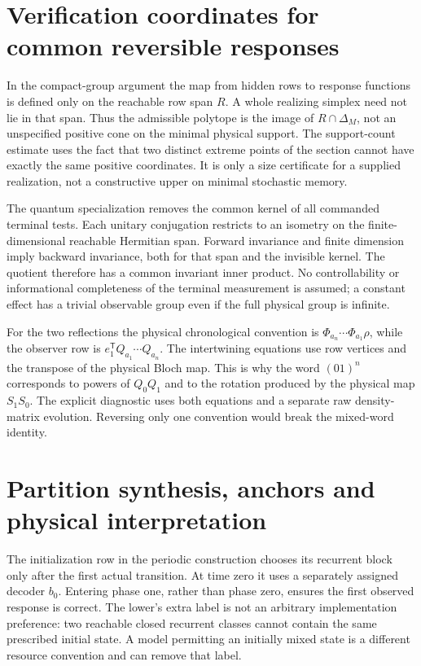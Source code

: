 \section{Verification coordinates for common reversible responses}\label{sec:supp-r72}
In the compact-group argument the map from hidden rows to response functions is defined only on the reachable row span $R$. A whole realizing simplex need not lie in that span. Thus the admissible polytope is the image of $R\cap\Delta_M$, not an unspecified positive cone on the minimal physical support. The support-count estimate uses the fact that two distinct extreme points of the section cannot have exactly the same positive coordinates. It is only a size certificate for a supplied realization, not a constructive upper on minimal stochastic memory.

The quantum specialization removes the common kernel of all commanded terminal tests. Each unitary conjugation restricts to an isometry on the finite-dimensional reachable Hermitian span. Forward invariance and finite dimension imply backward invariance, both for that span and the invisible kernel. The quotient therefore has a common invariant inner product. No controllability or informational completeness of the terminal measurement is assumed; a constant effect has a trivial observable group even if the full physical group is infinite.

For the two reflections the physical chronological convention is $\Phi_{a_n}\cdots\Phi_{a_1}\rho$, while the observer row is $e_1^{\mathsf T}Q_{a_1}\cdots Q_{a_n}$. The intertwining equations use row vertices and the transpose of the physical Bloch map. This is why the word $(01)^n$ corresponds to powers of $Q_0Q_1$ and to the rotation produced by the physical map $S_1S_0$. The explicit diagnostic uses both equations and a separate raw density-matrix evolution. Reversing only one convention would break the mixed-word identity.

\section{Partition synthesis, anchors and physical interpretation}\label{sec:supp-r72-partition}
The initialization row in the periodic construction chooses its recurrent block only after the first actual transition. At time zero it uses a separately assigned decoder $b_0$. Entering phase one, rather than phase zero, ensures the first observed response is correct. The lower's extra label is not an arbitrary implementation preference: two reachable closed recurrent classes cannot contain the same prescribed initial state. A model permitting an initially mixed state is a different resource convention and can remove that label.

